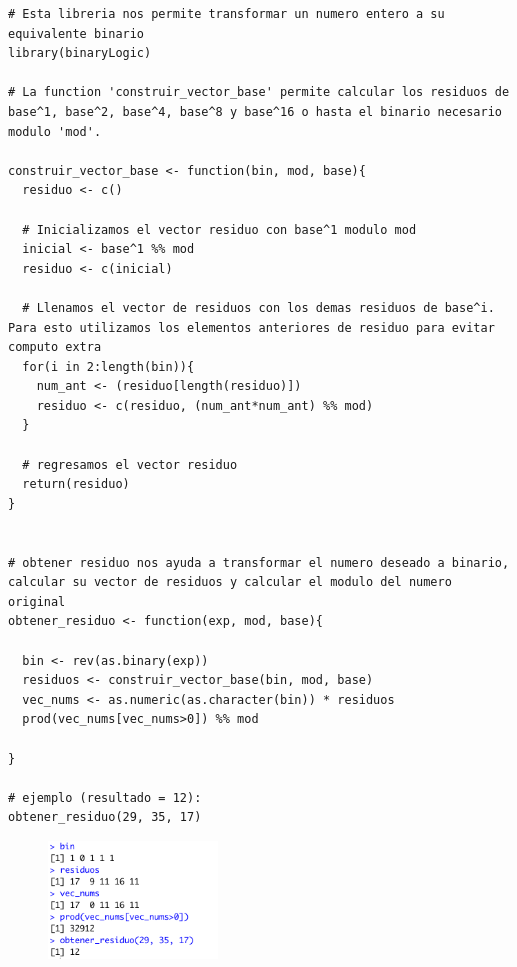\begin{lstlisting}
# Esta libreria nos permite transformar un numero entero a su equivalente binario
library(binaryLogic)

# La function 'construir_vector_base' permite calcular los residuos de base^1, base^2, base^4, base^8 y base^16 o hasta el binario necesario modulo 'mod'. 

construir_vector_base <- function(bin, mod, base){
  residuo <- c()
  
  # Inicializamos el vector residuo con base^1 modulo mod
  inicial <- base^1 %% mod
  residuo <- c(inicial)
  
  # Llenamos el vector de residuos con los demas residuos de base^i. Para esto utilizamos los elementos anteriores de residuo para evitar computo extra
  for(i in 2:length(bin)){
    num_ant <- (residuo[length(residuo)])
    residuo <- c(residuo, (num_ant*num_ant) %% mod)
  }
  
  # regresamos el vector residuo
  return(residuo)
}


# obtener residuo nos ayuda a transformar el numero deseado a binario, calcular su vector de residuos y calcular el modulo del numero original 
obtener_residuo <- function(exp, mod, base){
  
  bin <- rev(as.binary(exp))
  residuos <- construir_vector_base(bin, mod, base)  
  vec_nums <- as.numeric(as.character(bin)) * residuos
  prod(vec_nums[vec_nums>0]) %% mod
  
}

# ejemplo (resultado = 12):
obtener_residuo(29, 35, 17)

\end{lstlisting}

\begin{figure}[!h]
        \includegraphics[width=45mm]{imgs/Captura de Pantalla 2021-02-13 a la(s) 14.44.58.png}
\end{figure}

